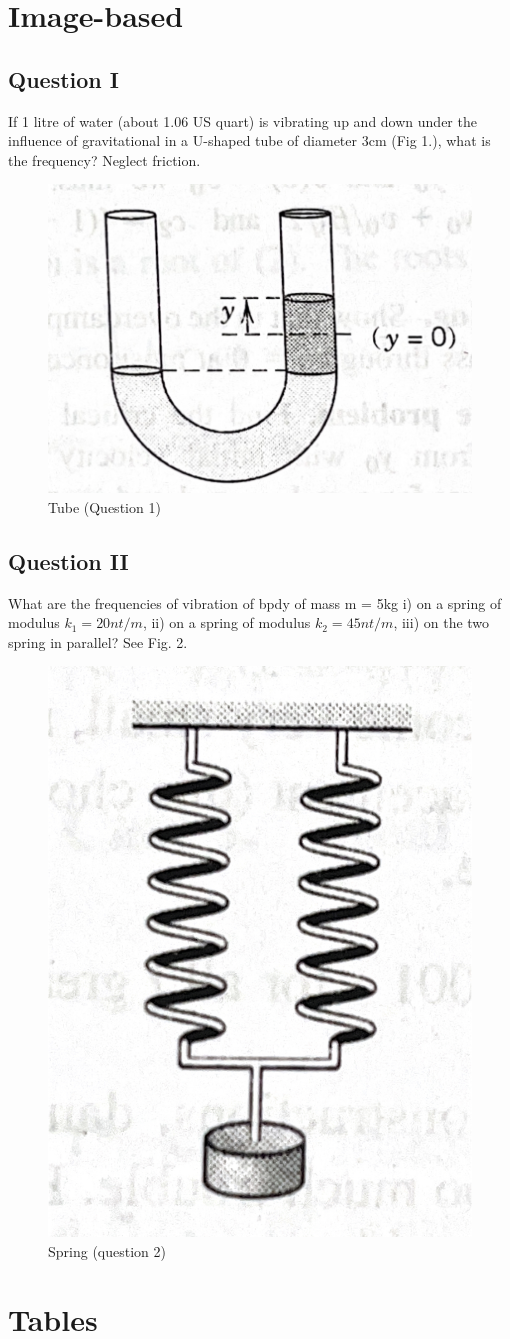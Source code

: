\documentclass[a4paper]{article}
\begin{document}
\newpage
\section{Image-based}
\subsection*{Question I}
If 1 litre of water (about 1.06 US quart) is vibrating up and down under the influence of gravitational in a U-shaped tube of diameter 3cm (Fig 1.), what is the frequency? Neglect friction.\cite{img}

\begin{figure}[h] 
\begin{center}
\includegraphics[width=.25\textwidth]{tube}
\caption{Tube (Question 1)}
 \label{fig1}
\end{center}
\end{figure}

\subsection*{Question II}
What are the frequencies of vibration of bpdy of mass m = 5kg i) on a spring of modulus $k_1 = 20 nt/m$, ii) on a spring of modulus $k_2 = 45 nt/m$, iii) on the two spring in parallel? See Fig. 2.
\cite{img}
\begin{figure}[h] 
 \begin{center}
  \includegraphics[width=.25\textwidth]{spring}
  \caption{Spring (question 2)}
 \label{fig2}
 \end{center}
\end{figure} 


\newpage
\section{Tables}
\end{document}
